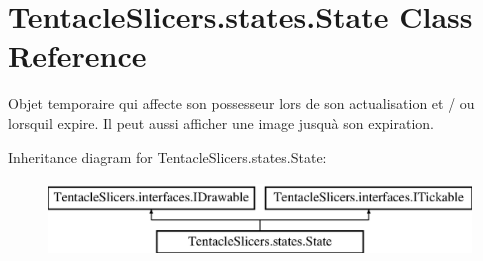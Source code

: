 \hypertarget{class_tentacle_slicers_1_1states_1_1_state}{}\section{Tentacle\+Slicers.\+states.\+State Class Reference}
\label{class_tentacle_slicers_1_1states_1_1_state}


Objet temporaire qui affecte son possesseur lors de son actualisation et / ou lorsqu\textquotesingle{}il expire. Il peut aussi afficher une image jusqu\textquotesingle{}à son expiration.  


Inheritance diagram for Tentacle\+Slicers.\+states.\+State\+:\begin{figure}[H]
\begin{center}
\leavevmode
\includegraphics[height=2.000000cm]{class_tentacle_slicers_1_1states_1_1_state}
\end{center}
\end{figure}
